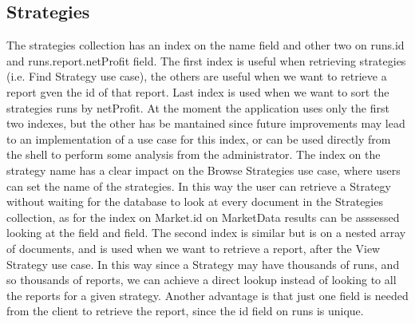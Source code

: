 


\subsection{Strategies}

The strategies collection has an index on the name field and other two on
runs.id and runs.report.netProfit field. The first index is useful when retrieving strategies
(i.e. Find Strategy use case), the others are useful when we want to retrieve a
report gven the id of that report. Last index is used when we want to sort the
strategies runs by netProfit. At the moment the application uses only the first
two
indexes, but the other has be mantained since future improvements may lead to an
implementation of a use case for this index, or can be used directly from the
shell to perform some analysis from the administrator.
The index on the strategy name has a clear impact on the Browse Strategies use
case, where users can set the name of the strategies. In this way the user can 
retrieve a Strategy without waiting for the database to look at every document
in the Strategies collection, as for the index on Market.id on MarketData
results can be asssessed looking at the 
field and  field.
The second index is similar but is on a nested array of documents, and is used when we
want to retrieve a report, after the View Strategy use case. In this way since a
Strategy may have thousands of runs, and so thousands of reports, we can achieve
a direct lookup instead of looking to all the reports for a given strategy.
Another advantage is that just one field is needed from the client to retrieve
the report, since the id field on runs is unique.








